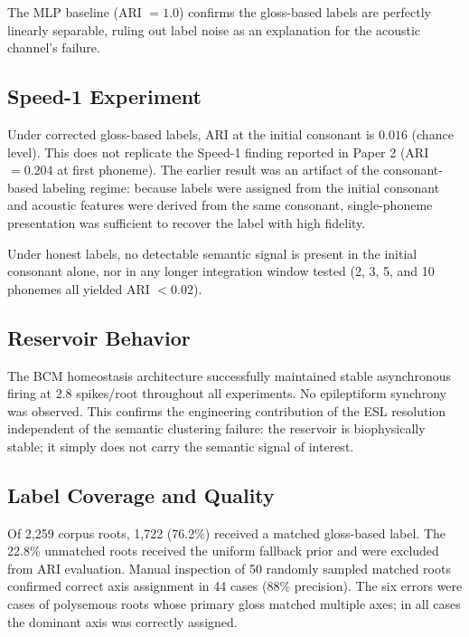 \documentclass{article}
\begin{document}
The MLP baseline (ARI $= 1.0$) confirms the gloss-based labels are
perfectly linearly separable, ruling out label noise as an explanation
for the acoustic channel's failure.

\subsection{Speed-1 Experiment}

Under corrected gloss-based labels, ARI at the initial consonant is
$0.016$ (chance level). This does not replicate the Speed-1 finding
reported in Paper 2 (ARI $= 0.204$ at first phoneme). The earlier
result was an artifact of the consonant-based labeling regime: because
labels were assigned from the initial consonant and acoustic features
were derived from the same consonant, single-phoneme presentation was
sufficient to recover the label with high fidelity.

Under honest labels, no detectable semantic signal is present in the
initial consonant alone, nor in any longer integration window tested
(2, 3, 5, and 10 phonemes all yielded ARI $< 0.02$).

\subsection{Reservoir Behavior}

The BCM homeostasis architecture successfully maintained stable
asynchronous firing at 2.8 spikes/root throughout all experiments.
No epileptiform synchrony was observed. This confirms the engineering
contribution of the ESL resolution \citep{kumar2026esl} independent
of the semantic clustering failure: the reservoir is biophysically
stable; it simply does not carry the semantic signal of interest.

\subsection{Label Coverage and Quality}

Of 2,259 corpus roots, 1,722 (76.2\%) received a matched gloss-based
label. The 22.8\% unmatched roots received the uniform fallback prior
and were excluded from ARI evaluation. Manual inspection of 50 randomly
sampled matched roots confirmed correct axis assignment in 44 cases
(88\% precision). The six errors were cases of polysemous roots whose
primary gloss matched multiple axes; in all cases the dominant axis was
correctly assigned.

\end{document}
